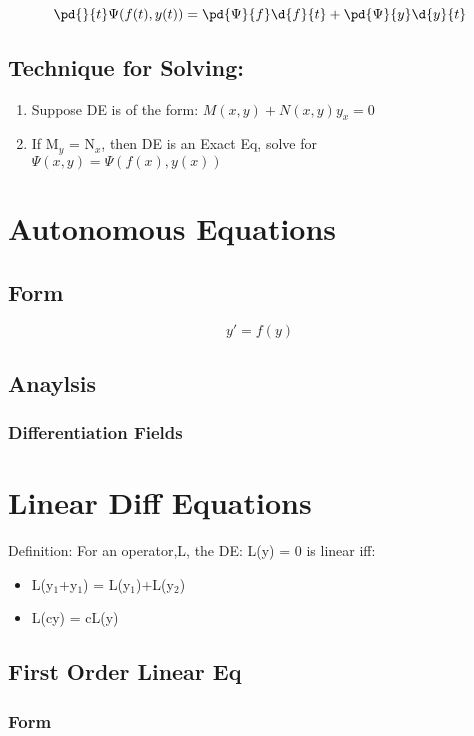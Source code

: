\documentclass[11pt]{article}
\begin{document}
   \begin{equation}
   \pd{}{t}\Psi(f(t),y(t)) = \pd{\Psi}{f}\d{f}{t} + \pd{\Psi}{y}\d{y}{t}
   \end{equation}
\subsection{Technique for Solving:}
\label{sec-7-2}

\begin{enumerate}
\item Suppose DE is of the form: $M(x,y) + N(x,y) y_x = 0$
\item If M$_y$ = N$_x$, then DE is an Exact Eq, solve for $\Psi(x,y) = \Psi( f(x), y(x))$
\end{enumerate}
\section{Autonomous Equations}
\label{sec-8}
\subsection{Form}
\label{sec-8-1}

   \begin{equation}
   y'=f(y)
   \end{equation}
\subsection{Anaylsis}
\label{sec-8-2}
\subsubsection{Differentiation Fields}
\label{sec-8-2-1}
\section{Linear Diff Equations}
\label{sec-9}

  Definition: For an operator,L, the DE: L(y) = 0 is linear iff:
\begin{itemize}
\item L(y$_1$+y$_1$) = L(y$_1$)+L(y$_2$)
\item L(cy) = cL(y)
\end{itemize}
\subsection{First Order Linear Eq}
\label{sec-9-1}
\subsubsection{Form}
\label{sec-9-1-1}
\end{document}
